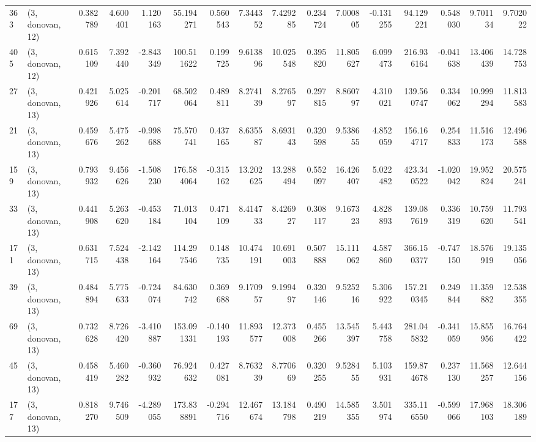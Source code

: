 \begin{tabular}{llrrrrrrrrrrrrrr}
363 &  (3, donovan, 12) &   0.382789 &   4.600401 &   1.120163 &    55.194271 &   0.560543 &   7.344352 &   7.429285 &  0.234724 &   7.000805 &  -0.131255 &    94.129221 &  0.548030 &   9.701134 &   9.702022 \\
405 &  (3, donovan, 12) &   0.615109 &   7.392440 &  -2.843349 &   100.511622 &   0.199725 &   9.613896 &  10.025548 &  0.395820 &  11.805627 &   6.099473 &   216.936164 & -0.041638 &  13.406439 &  14.728753 \\
27  &  (3, donovan, 13) &   0.421926 &   5.025614 &  -0.201717 &    68.502064 &   0.489811 &   8.274139 &   8.276597 &  0.297815 &   8.860797 &   4.310021 &   139.560747 &  0.334062 &  10.999294 &  11.813583 \\
21  &  (3, donovan, 13) &   0.459676 &   5.475262 &  -0.998688 &    75.570741 &   0.437165 &   8.635587 &   8.693143 &  0.320598 &   9.538655 &   4.852059 &   156.164717 &  0.254833 &  11.516173 &  12.496588 \\
159 &  (3, donovan, 13) &   0.793932 &   9.456626 &  -1.508230 &   176.584064 &  -0.315162 &  13.202625 &  13.288494 &  0.552097 &  16.426407 &   5.022482 &   423.340522 & -1.020042 &  19.952824 &  20.575241 \\
33  &  (3, donovan, 13) &   0.441908 &   5.263620 &  -0.453184 &    71.013104 &   0.471109 &   8.414733 &   8.426927 &  0.308117 &   9.167323 &   4.828893 &   139.087619 &  0.336319 &  10.759620 &  11.793541 \\
171 &  (3, donovan, 13) &   0.631715 &   7.524438 &  -2.142164 &   114.297546 &   0.148735 &  10.474191 &  10.691003 &  0.507888 &  15.111062 &   4.587860 &   366.150377 & -0.747150 &  18.576919 &  19.135056 \\
39  &  (3, donovan, 13) &   0.484894 &   5.775633 &  -0.724074 &    84.630742 &   0.369688 &   9.170957 &   9.199497 &  0.320146 &   9.525216 &   5.306922 &   157.210345 &  0.249844 &  11.359882 &  12.538355 \\
69  &  (3, donovan, 13) &   0.732628 &   8.726420 &  -3.410887 &   153.091331 &  -0.140193 &  11.893577 &  12.373008 &  0.455266 &  13.545397 &   5.443758 &   281.045832 & -0.341059 &  15.855956 &  16.764422 \\
45  &  (3, donovan, 13) &   0.458419 &   5.460282 &  -0.360932 &    76.924632 &   0.427081 &   8.763239 &   8.770669 &  0.320255 &   9.528455 &   5.103931 &   159.874678 &  0.237130 &  11.568257 &  12.644156 \\
177 &  (3, donovan, 13) &   0.818270 &   9.746509 &  -4.289055 &   173.838891 &  -0.294716 &  12.467674 &  13.184798 &  0.490219 &  14.585355 &   3.501974 &   335.116550 & -0.599066 &  17.968103 &  18.306189 \\

\end{tabular}

